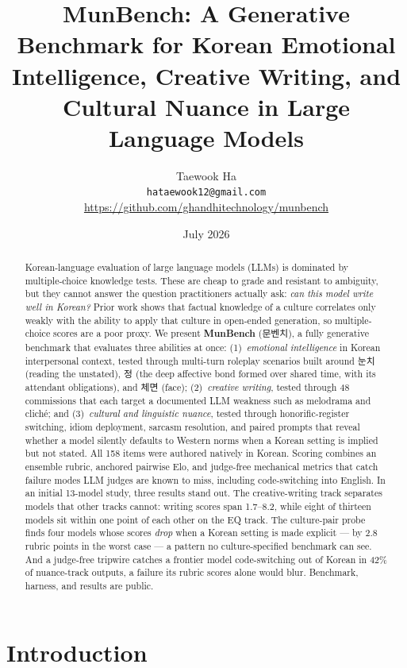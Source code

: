 \documentclass[11pt]{article}
\title{\textbf{MunBench: A Generative Benchmark for Korean Emotional
Intelligence, Creative Writing, and Cultural Nuance in Large Language Models}}
\author{Taewook Ha\\
\texttt{hataewook12@gmail.com}\\
\small\url{https://github.com/ghandhitechnology/munbench}}
\date{July 2026}
\newcommand{\ko}[1]{#1}
\begin{document}
\maketitle

\begin{abstract}
Korean-language evaluation of large language models (LLMs) is dominated by
multiple-choice knowledge tests. These are cheap to grade and resistant to
ambiguity, but they cannot answer the question practitioners actually ask:
\emph{can this model write well in Korean?} Prior work shows that factual
knowledge of a culture correlates only weakly with the ability to apply that
culture in open-ended generation, so multiple-choice scores are a poor proxy.
We present \textbf{MunBench} (\ko{문벤치}), a fully generative benchmark that
evaluates three abilities at once: (1)~\emph{emotional intelligence} in
Korean interpersonal context, tested through multi-turn roleplay scenarios
built around \ko{눈치} (reading the unstated), \ko{정} (the deep
affective bond formed over shared time, with its attendant obligations),
and \ko{체면} (face); (2)~\emph{creative writing}, tested
through 48 commissions that each target a documented LLM weakness such as
melodrama and clich\'e; and (3)~\emph{cultural and linguistic nuance},
tested through honorific-register switching, idiom deployment, sarcasm
resolution, and paired prompts that reveal whether a model silently defaults
to Western norms when a Korean setting is implied but not stated. All 158
items were authored natively in Korean. Scoring combines an ensemble
rubric, anchored pairwise Elo, and judge-free mechanical metrics that catch
failure modes LLM judges are known to miss, including code-switching into
English. In an initial 13-model study, three results stand out. The
creative-writing track separates models that other tracks cannot: writing
scores span 1.7--8.2, while eight of thirteen models sit within one point
of each other on the EQ track. The culture-pair probe finds four models
whose scores \emph{drop} when a Korean setting is made explicit --- by
2.8 rubric points in the worst case --- a pattern no culture-specified
benchmark can see. And a judge-free tripwire catches a frontier model
code-switching out of Korean in 42\% of nuance-track outputs, a failure
its rubric scores alone would blur. Benchmark, harness,
and results are public.
\end{abstract}

\section{Introduction}
\end{document}
